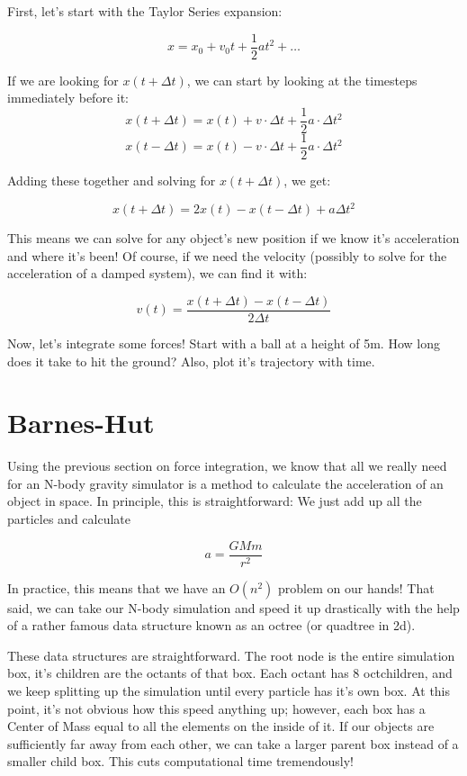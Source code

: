 \documentclass[11pt]{article}
\begin{document}
First, let's start with the Taylor Series expansion:

$$x = x_0 + v_0 t + \frac{1}{2}at^2 + \ldots$$

If we are looking for $x(t + \Delta t)$, we can start by looking at the timesteps immediately before it:
$$x(t+\Delta t) = x(t) + v \cdot \Delta t + \frac{1}{2} a\cdot\Delta t^2$$
$$x(t-\Delta t) = x(t) - v \cdot \Delta t + \frac{1}{2} a\cdot\Delta t^2$$

Adding these together and solving for $x(t + \Delta t)$, we get:

$$x(t + \Delta t) = 2x(t) - x(t - \Delta t) + a \Delta t^2$$

This means we can solve for any object's new position if we know it's acceleration and where it's been! Of course, if we need the velocity (possibly to solve for the acceleration of a damped system), we can find it with:

$$v(t) = \frac{x(t + \Delta t) - x(t - \Delta t)}{2\Delta t}$$

Now, let's integrate some forces! Start with a ball at a height of 5m. How long does it take to hit the ground? Also, plot it's trajectory with time.

\newpage
\section*{Barnes-Hut}
Using the previous section on force integration, we know that all we really need for an N-body gravity simulator is a method to calculate the acceleration of an object in space. In principle, this is straightforward: We just add up all the particles and calculate

$$a = \frac{GMm}{r^2}$$

In practice, this means that we have an $O(n^2)$ problem on our hands! That said, we can take our N-body simulation and speed it up drastically with the help of a rather famous data structure known as an octree (or quadtree in 2d).

These data structures are straightforward. The root node is the entire simulation box, it's children are the octants of that box. Each octant has 8 octchildren, and we keep splitting up the simulation until every particle has it's own box. At this point, it's not obvious how this speed anything up; however, each box has a Center of Mass equal to all the elements on the inside of it. If our objects are sufficiently far away from each other, we can take a larger parent box instead of a smaller child box. This cuts computational time tremendously!
\end{document}

